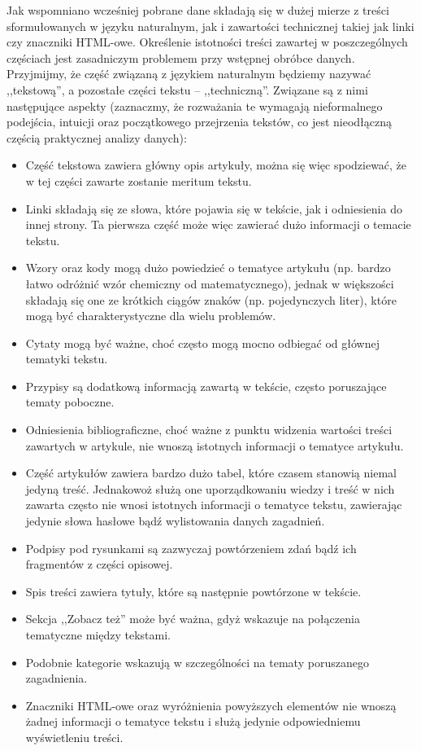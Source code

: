 \documentclass{praca1}
\begin{document}
Jak wspomniano wcześniej pobrane dane składają się w dużej mierze z treści sformułowanych w języku naturalnym, jak i zawartości technicznej takiej jak linki czy znaczniki HTML-owe. Określenie istotności treści zawartej w poszczególnych częściach jest zasadniczym problemem przy wstępnej obróbce danych. Przyjmijmy, że część związaną z językiem naturalnym będziemy nazywać ,,tekstową'', a pozostałe części tekstu -- ,,techniczną''. Związane są z nimi następujące aspekty (zaznaczmy, że rozważania te wymagają nieformalnego podejścia, intuicji oraz początkowego przejrzenia tekstów, co jest nieodłączną częścią praktycznej analizy danych):
\begin{itemize}
\item Część tekstowa zawiera główny opis artykuły, można się więc spodziewać, że w tej części zawarte zostanie meritum tekstu.
\item Linki składają się ze słowa, które pojawia się w tekście, jak i odniesienia do innej strony. Ta pierwsza część może więc zawierać dużo informacji o temacie tekstu.
\item Wzory oraz kody mogą dużo powiedzieć o tematyce artykułu (np. bardzo łatwo odróżnić wzór chemiczny od matematycznego), jednak w większości składają się one ze krótkich ciągów znaków (np. pojedynczych liter), które mogą być charakterystyczne dla wielu problemów.
\item Cytaty mogą być ważne, choć często mogą mocno odbiegać od głównej tematyki tekstu.
\item Przypisy są dodatkową informacją zawartą w tekście, często poruszające tematy poboczne.
\item Odniesienia bibliograficzne, choć ważne z punktu widzenia wartości treści zawartych w artykule, nie wnoszą istotnych informacji o tematyce artykułu.
\item Część artykułów zawiera bardzo dużo tabel, które czasem stanowią niemal jedyną treść. Jednakowoż służą one uporządkowaniu wiedzy i treść w nich zawarta często nie wnosi istotnych informacji o tematyce tekstu, zawierając jedynie słowa hasłowe bądź wylistowania danych zagadnień.
\item Podpisy pod rysunkami są zazwyczaj powtórzeniem zdań bądź ich fragmentów z części opisowej.
\item Spis treści zawiera tytuły, które są następnie powtórzone w tekście.
\item Sekcja ,,Zobacz też'' może być ważna, gdyż wskazuje na połączenia tematyczne między tekstami.
\item Podobnie kategorie wskazują w szczególności na tematy poruszanego zagadnienia.
\item Znaczniki HTML-owe oraz wyróżnienia powyższych elementów nie wnoszą żadnej informacji o tematyce tekstu i służą jedynie odpowiedniemu wyświetleniu treści.
\end{itemize}
\end{document}
